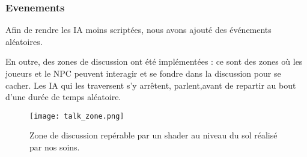    
    \subsubsection{Evenements}

    Afin de rendre les IA moins scriptées, nous avons ajouté des événements aléatoires.
    
    En outre, des zones de discussion ont été implémentées : ce sont des zones où les joueurs et le NPC peuvent interagir 
    et se fondre dans la discussion pour se cacher. Les IA qui les traversent s'y arrêtent, parlent,avant de repartir au bout d'une durée 
    de temps aléatoire.

    \begin{figure}[hbt!]
        \centering
        \texttt{[image: talk\_zone.png]}
        \caption{Zone de discussion repérable par un shader au niveau du sol réalisé par nos soins.}
    \end{figure}